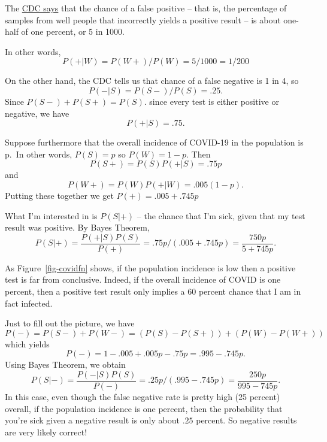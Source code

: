 \documentclass[
  11pt,
  letterpaper,
]{scrbook}
\theoremstyle{plain}
\theoremstyle{plain}
\theoremstyle{remark}
\begin{document}
The
\href{https://www.icd10monitor.com/false-positives-in-pcr-tests-for-covid-19}{CDC
says} that the chance of a false positive -- that is, the percentage of
samples from well people that incorrectly yields a positive result -- is
about one-half of one percent, or 5 in 1000.

In other words, \[
P(+|W) = P(W+)/P(W) = 5/1000=1/200
\]

On the other hand, the CDC tells us that chance of a false negative is 1
in 4, so \[
P(-|S) = P(S-)/P(S) = .25.
\] Since \(P(S-)+P(S+)=P(S).\) since every test is either positive or
negative, we have \[
P(+|S) = .75.
\]

Suppose furthermore that the overall incidence of COVID-19 in the
population is p.~In other words, \(P(S)=p\) so \(P(W)=1-p\). Then
\[P(S+)=P(S)P(+|S)=.75p\] and \[
P(W+)=P(W)P(+|W)=.005(1-p).
\] Putting these together we get \(P(+)=.005+.745p\)

What I'm interested in is \(P(S|+)\) -- the chance that I'm sick, given
that my test result was positive. By Bayes Theorem, \[
P(S|+)=\frac{P(+|S)P(S)}{P(+)}=.75p/(.005+.745p)=\frac{750p}{5+745p}.
\]

As Figure~\ref{fig-covidfn} shows, if the population incidence is low
then a positive test is far from conclusive. Indeed, if the overall
incidence of COVID is one percent, then a positive test result only
implies a 60 percent chance that I am in fact infected.

Just to fill out the picture, we have \[
P(-) = P(S-)+P(W-)=(P(S)-P(S+))+(P(W)-P(W+))
\] which yields \[
P(-)=1-.005+.005p-.75p = .995-.745p.
\] Using Bayes Theorem, we obtain \[
P(S|-) = \frac{P(-|S)P(S)}{P(-)} = .25p/(.995-.745p) =\frac{250p}{995-745p}.
\] In this case, even though the false negative rate is pretty high (25
percent) overall, if the population incidence is one percent, then the
probability that you're sick given a negative result is only about
\(.25\) percent. So negative results are very likely correct!
\end{document}
